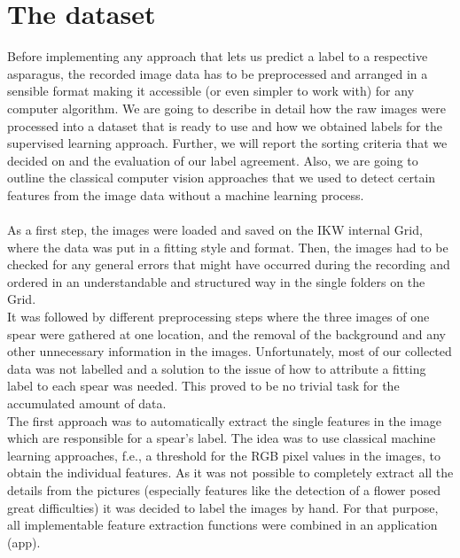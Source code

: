 \section{The dataset}

Before implementing any approach that lets us predict a label to a respective asparagus, the recorded image data has to be preprocessed and arranged in a sensible format making it accessible (or even simpler to work with) for any computer algorithm. We are going to describe in detail how the raw images were processed into a dataset that is ready to use and how we obtained labels for the supervised learning approach. Further, we will report the sorting criteria that we decided on and the evaluation of our label agreement. Also, we are going to outline the classical computer vision approaches that we used to detect certain features from the image data without a machine learning process. \\
\\
As a first step, the images were loaded and saved on the IKW internal Grid, where the data was put in a fitting style and format. Then, the images had to be checked for any general errors that might have occurred during the recording and ordered in an understandable and structured way in the single folders on the Grid. \\
It was followed by different preprocessing steps where the three images of one spear were gathered at one location, and the removal of the background and any other unnecessary information in the images. Unfortunately, most of our collected data was not labelled and a solution to the issue of how to attribute a fitting label to each spear was needed. This proved to be no trivial task for the accumulated amount of data. \\
The first approach was to automatically extract the single features in the image which are responsible for a spear's label. The idea was to use classical machine learning approaches, f.e., a threshold for the RGB pixel values in the images, to obtain the individual features. As it was not possible to completely extract all the details from the pictures (especially features like the detection of a flower posed great difficulties) it was decided to label the images by hand. For that purpose, all implementable feature extraction functions were combined in an application (app). \\

